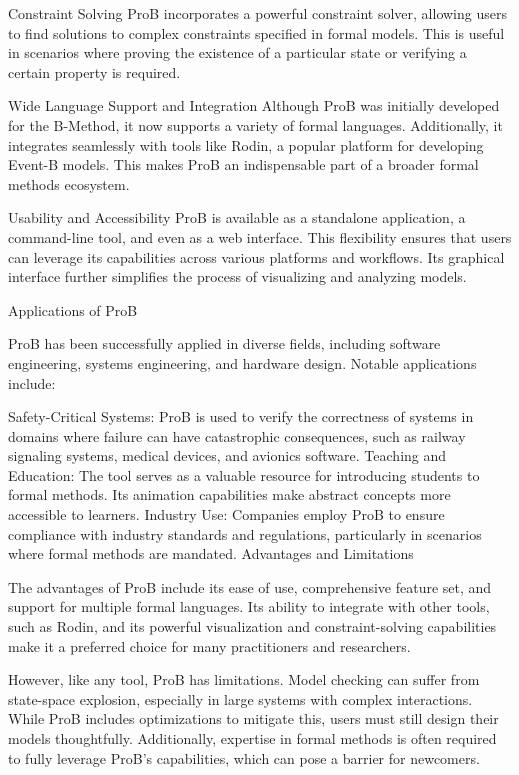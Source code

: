 Constraint Solving
ProB incorporates a powerful constraint solver, allowing users to find solutions to complex constraints specified in formal models. This is useful in scenarios where proving the existence of a particular state or verifying a certain property is required.

Wide Language Support and Integration
Although ProB was initially developed for the B-Method, it now supports a variety of formal languages. Additionally, it integrates seamlessly with tools like Rodin, a popular platform for developing Event-B models. This makes ProB an indispensable part of a broader formal methods ecosystem.

Usability and Accessibility
ProB is available as a standalone application, a command-line tool, and even as a web interface. This flexibility ensures that users can leverage its capabilities across various platforms and workflows. Its graphical interface further simplifies the process of visualizing and analyzing models.

Applications of ProB

ProB has been successfully applied in diverse fields, including software engineering, systems engineering, and hardware design. Notable applications include:

Safety-Critical Systems: ProB is used to verify the correctness of systems in domains where failure can have catastrophic consequences, such as railway signaling systems, medical devices, and avionics software.
Teaching and Education: The tool serves as a valuable resource for introducing students to formal methods. Its animation capabilities make abstract concepts more accessible to learners.
Industry Use: Companies employ ProB to ensure compliance with industry standards and regulations, particularly in scenarios where formal methods are mandated.
Advantages and Limitations

The advantages of ProB include its ease of use, comprehensive feature set, and support for multiple formal languages. Its ability to integrate with other tools, such as Rodin, and its powerful visualization and constraint-solving capabilities make it a preferred choice for many practitioners and researchers.

However, like any tool, ProB has limitations. Model checking can suffer from state-space explosion, especially in large systems with complex interactions. While ProB includes optimizations to mitigate this, users must still design their models thoughtfully. Additionally, expertise in formal methods is often required to fully leverage ProB’s capabilities, which can pose a barrier for newcomers.

